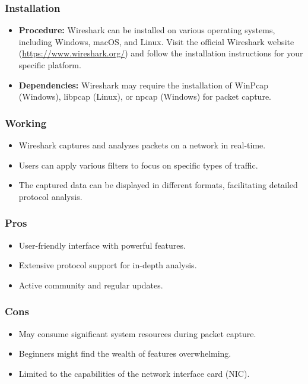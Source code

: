 \documentclass[11pt]{article}
\begin{document}
\subsubsection{Installation}
\begin{itemize}
	\item \textbf{Procedure:} Wireshark can be installed on various operating systems, including Windows, macOS, and Linux. Visit the official Wireshark website (\url{https://www.wireshark.org/}) and follow the installation instructions for your specific platform.
	\item \textbf{Dependencies:} Wireshark may require the installation of WinPcap (Windows), libpcap (Linux), or npcap (Windows) for packet capture.
\end{itemize}

\subsubsection{Working}
\begin{itemize}
	\item Wireshark captures and analyzes packets on a network in real-time.
	\item Users can apply various filters to focus on specific types of traffic.
	\item The captured data can be displayed in different formats, facilitating detailed
	      protocol analysis.
\end{itemize}

\subsubsection{Pros}
\begin{itemize}
	\item User-friendly interface with powerful features.
	\item Extensive protocol support for in-depth analysis.
	\item Active community and regular updates.
\end{itemize}

\subsubsection{Cons}
\begin{itemize}
	\item May consume significant system resources during packet capture.
	\item Beginners might find the wealth of features overwhelming.
	\item Limited to the capabilities of the network interface card (NIC).
\end{itemize}
\end{document}
